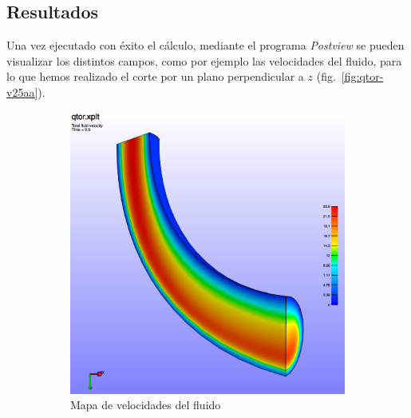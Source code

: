 \subsection{Resultados}

Una vez ejecutado con éxito el cálculo, mediante el programa \emph{Postview} se pueden visualizar los distintos campos, como por ejemplo las velocidades del fluido, para lo que hemos realizado el corte por un plano perpendicular a $z$ (fig.~\ref{fig:qtor-v25aa}).
\begin{figure}[!ht]
\centering
\begin{subfigure}[b]{0.48\textwidth}
\centering
\includegraphics[width=\linewidth]{figuras_4/qtor-v25.png}
\caption{Mapa de velocidades del fluido}
\label{fig:qtor-v25}
\end{subfigure}
\hfil
\begin{subfigure}[b]{0.48\textwidth}

\end{subfigure}
\end{figure}
